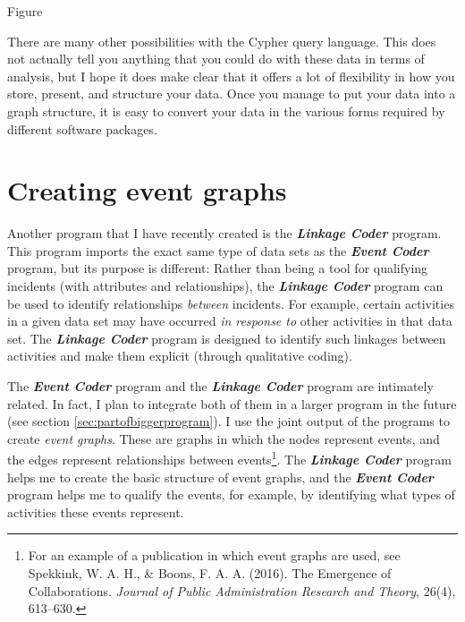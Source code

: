 \documentclass{memoir}
\begin{document}
Figure %


There are many other possibilities with the Cypher query language. This does not actually tell you anything that you could do with these data in terms of analysis, but I hope it does make clear that it offers a lot of flexibility in how you store, present, and structure your data. Once you manage to put your data into a graph structure, it is easy to convert your data in the various forms required by different software packages.

\section{Creating event graphs}
\label{sec:creatingeventgraphs}

Another program that I have recently created is the \emph{\textbf{Linkage Coder}} program. This program imports the exact same type of data sets as the \emph{\textbf{Event Coder}} program, but its purpose is different: Rather than being a tool for qualifying incidents (with attributes and relationships), the \textbf{\emph{Linkage Coder}} program can be used to identify relationships \emph{between} incidents. For example, certain activities in a given data set may have occurred \emph{in response to} other activities in that data set. The \emph{\textbf{Linkage Coder}} program is designed to identify such linkages between activities and make them explicit (through qualitative coding).

The \textbf{\emph{Event Coder}} program and the \textbf{\emph{Linkage Coder}} program are intimately related. In fact, I plan to integrate both of them in a larger program in the future (see section \ref{sec:partofbiggerprogram}). I use the joint output of the programs to create \emph{event graphs}. These are graphs in which the nodes represent events, and the edges represent relationships between events\footnote{For an example of a publication in which event graphs are used, see Spekkink, W. A. H., \& Boons, F. A. A. (2016). The Emergence of Collaborations. \emph{Journal of Public Administration Research and Theory}, 26(4), 613–630.}. The \textbf{\emph{Linkage Coder}} program helps me to create the basic structure of event graphs, and the \textbf{\emph{Event Coder}} program helps me to qualify the events, for example, by identifying what types of activities these events represent.
\end{document}
